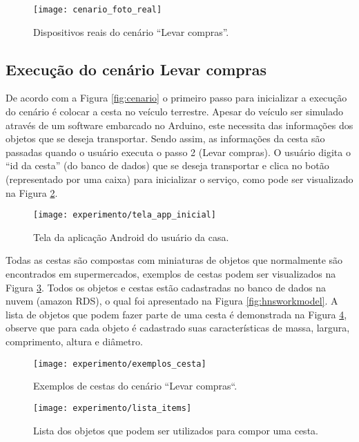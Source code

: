 \begin{figure}[!htb] \centering 
  \centering
  \texttt{[image: cenario\_foto\_real]} 
  \caption{Dispositivos reais do cenário ``Levar compras''.} 
  \label{fig:cenario_real}
\end{figure} 

\subsection{Execução do cenário Levar compras}
\label{subsec:execcena}
De acordo com a Figura \ref{fig:cenario} o primeiro passo para inicializar a execução do cenário é colocar a cesta no veículo terrestre. Apesar do veículo ser simulado através de um software embarcado no Arduino, este necessita das informações dos objetos que se deseja transportar. Sendo assim, as informações da cesta são passadas quando o usuário executa o passo 2 (Levar compras). O usuário digita o ``id da cesta'' (do banco de dados) que se deseja transportar e clica no botão (representado por uma caixa) para inicializar o serviço, como pode ser visualizado na Figura \ref{fig:tela_app_inicial}.
\begin{figure}[!htb] \centering 
  \centering
  \texttt{[image: experimento/tela\_app\_inicial]} 
  \caption{Tela da aplicação Android do usuário da casa.} 
  \label{fig:tela_app_inicial}
\end{figure}
Todas as cestas são compostas com miniaturas de objetos que normalmente são encontrados em supermercados, exemplos de cestas podem ser visualizados na Figura \ref{fig:exemplos_cesta}. Todos os objetos e cestas estão cadastradas no banco de dados na nuvem (amazon RDS), o qual foi apresentado na Figura \ref{fig:hnsworkmodel}. A lista de objetos que podem fazer parte de uma cesta é demonstrada na Figura \ref{fig:lista_objetos}, observe que para cada objeto é cadastrado suas características de massa, largura, comprimento, altura e diâmetro.

\begin{figure}[!htb] \centering 
  \centering
  \texttt{[image: experimento/exemplos\_cesta]} 
  \caption{Exemplos de cestas do cenário ``Levar compras``.} 
  \label{fig:exemplos_cesta}
\end{figure}

\begin{figure}[!htb] \centering 
  \centering
  \texttt{[image: experimento/lista\_items]} 
  \caption{Lista dos objetos que podem ser utilizados para compor uma cesta.} 
  \label{fig:lista_objetos}
\end{figure}


